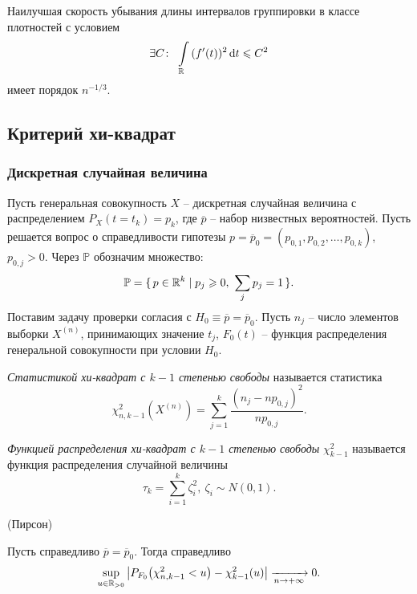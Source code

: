 \begin{theorem}
    Наилучшая скорость убывания длины интервалов группировки в классе плотностей
    с условием
    \[
        \exists C\colon~ \int\limits_{\mathbb{R}}{(f'(t))^2 \,\mathrm{d} t} \leqslant C^2
    \]
    имеет порядок $n^{-1/3}$.
\end{theorem}

\subsection{Критерий хи-квадрат}

\subsubsection{Дискретная случайная величина}
Пусть генеральная совокупность $X$ -- дискретная случайная величина с
распределением $P_X(t = t_k) = p_k$, где $\overline{p}$ -- набор низвестных
вероятностей. Пусть решается вопрос о справедливости гипотезы 
$p = \overline{p}_0 = (p_{0, 1}, p_{0, 2}, \ldots, p_{0, k})$, $p_{0, j} > 0$.
Через $\mathbb{P}$ обозначим множество:
\[
    \mathbb{P} = \{\,p \in \mathbb{R}^k \mid p_j \geqslant 0,~ \sum_j{p_j} = 1 \,\}
.\]
Поставим задачу проверки согласия с $H_0 \equiv \overline{p} = \overline{p}_0$.
Пусть $n_j$ -- число элементов выборки $X^{(n)}$, принимающих значение $t_j$, 
$F_0(t)$ -- функция распределения генеральной совокупности при условии $H_0$.

\begin{definition}
    \textit{Статистикой хи-квадрат с $k - 1$ степенью свободы} называется
    статистика
    \[
        \chi^2_{n, k - 1}(X^{(n)}) = 
        \sum_{j = 1}^k{\frac{(n_j - n p_{0, j})^2}{np_{0, j}}}
    .\]
\end{definition}

\begin{definition}
    \textit{Функцией распределения хи-квадрат с $k - 1$ степенью свободы}
    $\chi^2_{k - 1}$ называется функция распределения случайной величины
    \[
        \tau_k = \sum_{i = 1}^k{\zeta^2_i},~ \zeta_i \sim N(0, 1)
    .\]
\end{definition}

\begin{theorem}(Пирсон)

    Пусть справедливо $\overline{p} = \overline{p}_0$. Тогда справедливо
    \[
        \sup_{u \in \R_{>0}}{\abs*{P_{F_0}\parens*{\chi^2_{n, k - 1} < u}
        - \chi^2_{k - 1}(u)}}
        \xrightarrow[n \to +\infty]{} 0
    .\]
\end{theorem}

